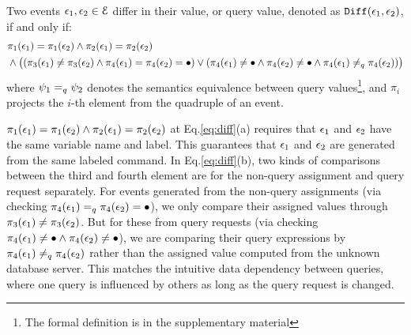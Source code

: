 \begin{defn}
\label{def:diff}
Two events $\mathtt{\epsilon}_1, \mathtt{\epsilon}_2 \in \mathcal{E}$ differ in their value, or query value,
denoted as $\mathtt{Diff}(\mathtt{\epsilon}_1, \mathtt{\epsilon}_2)$, if and only if:
{\small
\begin{subequations}
\begin{align}
& \pi_1(\mathtt{\epsilon}_1) = \pi_1(\mathtt{\epsilon}_2) 
  \land  
  \pi_2(\mathtt{\epsilon}_1) = \pi_2(\mathtt{\epsilon}_2) \\
& \land  
  \big(
   (\pi_3(\mathtt{\epsilon}_1) \neq \pi_3(\mathtt{\epsilon}_2)
  \land 
  \pi_{4}(\mathtt{\epsilon}_1) = \pi_{4}(\mathtt{\epsilon}_2) = \bullet )
  \lor 
  (\pi_4(\mathtt{\epsilon}_1) \neq \bullet
  \land 
  \pi_4(\mathtt{\epsilon}_2) \neq \bullet
  \land 
  \pi_{4}(\mathtt{\epsilon}_1) \neq_q \pi_{4}(\mathtt{\epsilon}_2)) 
  \big)
\end{align}
\label{eq:diff}
\end{subequations}
}
where $\psi_1 =_{q} \psi_2$ denotes the semantics equivalence between query values\footnote{The formal definition is in the supplementary material},
and $\pi_i$ projects the $i$-th element from the quadruple of an event.
\end{defn}
{
$\pi_1(\mathtt{\epsilon}_1) = \pi_1(\mathtt{\epsilon}_2) 
  \land  
  \pi_2(\mathtt{\epsilon}_1) = \pi_2(\mathtt{\epsilon}_2)$ at Eq.\ref{eq:diff}(a)
requires that $\mathtt{\epsilon}_1$ and $\mathtt{\epsilon}_2$ have the same variable name and label. 
This guarantees that $\mathtt{\epsilon}_1$ and $\mathtt{\epsilon}_2$ are generated from the same labeled command.
In Eq.\ref{eq:diff}(b),
two kinds of comparisons between the third and fourth element are for the non-query assignment and query request separately.
For events generated from the non-query assignments (via checking
$\pi_{4}(\mathtt{\epsilon}_1) =_q \pi_{4}(\mathtt{\epsilon}_2) = \bullet$), we only compare their assigned values through $\pi_3(\mathtt{\epsilon}_1) \neq \pi_3(\mathtt{\epsilon}_2)$.
But for these from query requests (via checking
$\pi_{4}(\mathtt{\epsilon}_1) \neq \bullet \land \pi_{4}(\mathtt{\epsilon}_2) \neq \bullet$),
we are comparing their query expressions by $\pi_{4}(\mathtt{\epsilon}_1) \neq_q \pi_{4}(\mathtt{\epsilon}_2)$ rather than the assigned value computed from the unknown database server.
This matches the intuitive data dependency between queries, where one query is influenced by others as long as the query request is changed.
}

